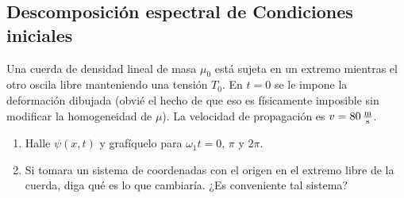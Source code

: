 \subsection*{Descomposición espectral de Condiciones iniciales}

\item
\begin{minipage}[t][2.3cm]{0.6\textwidth}
Una cuerda de densidad lineal de masa $\mu_{0}$ está sujeta en un extremo mientras el otro oscila libre manteniendo una tensión $T_{0}$.
En $t = 0$ se le impone la deformación dibujada (obvié el hecho de que eso es físicamente imposible sin modificar la homogeneidad de $\mu$).
La velocidad de propagación es \(v = \SI{80}{\metre\over\second} \).
\end{minipage}
\begin{minipage}[c][0.4cm][t]{0.34\textwidth}
\end{minipage}
\begin{enumerate}
	\item Halle $\psi(x,t)$ y grafíquelo para $\omega_1 t = 0,\,\pi$ y $2\pi$.
	\item Si tomara un sistema de coordenadas con el origen en el extremo libre de la cuerda, diga qué es lo que cambiaría.
	¿Es conveniente tal sistema?
\end{enumerate}





